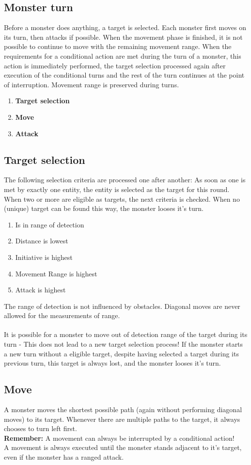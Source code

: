\subsection{Monster turn}
Before a monster does anything, a target is selected. Each monster first moves on its turn, then attacks if possible. When the movement phase is finished, it is not possible to continue to move with the remaining movement range. When the requirements for a conditional action are met during the turn of a monster, this action is immediately performed, the target selection processed again after execution of the conditional turns and the rest of the turn continues at the point of interruption. Movement range is preserved during turns.
\begin{enumerate}
	\item \textbf{Target selection}
	\item \textbf{Move}
	\item \textbf{Attack}
\end{enumerate}
\subsection{Target selection}
The following selection criteria are processed one after another: As soon as one is met by exactly one entity, the entity is selected as the target for this round. When two or more are eligible as targets, the next criteria is checked. When no (unique) target can be found this way, the monster looses it's turn.
\begin{enumerate}
	\item Is in range of detection
	\item Distance is lowest
	\item Initiative is highest
	\item Movement Range is highest
	\item Attack is highest
\end{enumerate}

The range of detection is not influenced by obstacles. Diagonal moves are never allowed for the measurements of range.\\ \\It is possible for a monster to move out of detection range of the target during its turn - This does not lead to a new target selection process! If the monster starts a new turn without a eligible target, despite having selected a target during its previous turn, this target is always lost, and the monster looses it's turn.
\subsection{Move}
A monster moves the shortest possible path (again without performing diagonal moves) to its target. Whenever there are multiple paths to the target, it always chooses to turn left first. \\\textbf{Remember:} A movement can always be interrupted by a conditional action!\\A movement is always executed until the monster stands adjacent to it's target, even if the monster has a ranged attack.


